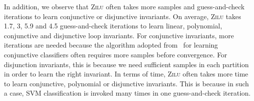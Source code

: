
In addition, we observe that \textsc{Zilu} often takes more samples and guess-and-check iterations to learn conjunctive or disjunctive invariants. On average, \textsc{Zilu} takes 1.7, 3, 5.9 and 4.5 guess-and-check iterations to learn linear, polynomial, conjunctive and disjunctive loop invariants. For conjunctive invariants, more iterations are needed because the algorithm adopted from~\cite{sharma2012interpolants} for learning conjunctive classifiers often requires more samples before convergence. For disjunction invariants, this is because we need sufficient samples in each partition in order to learn the right invariant. In terms of time, \textsc{Zilu} often takes more time to learn conjunctive, polynomial or disjunctive invariants. This is because in such a case, SVM classification is invoked many times in one guess-and-check iteration.

